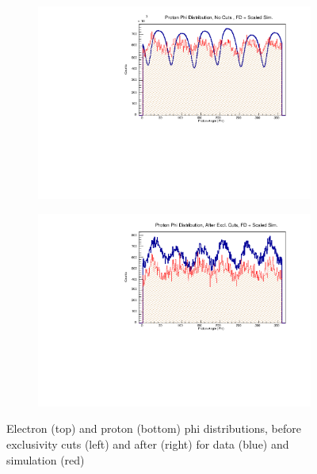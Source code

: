 \begin{figure}
\begin{subfigure}{.45\textwidth}
                \includegraphics[width=1\textwidth]{figures/Simulation/kinematics_basic/hist_proton_phi_nocut_fd_Double.pdf}
            \end{subfigure}%
            \begin{subfigure}{.45\textwidth}
                \centering
                \includegraphics[width=1\textwidth]{figures/Simulation/kinematics_basic/hist_proton_phi_excut_fd_Double.pdf}
            \end{subfigure}
            \caption[short]{Electron (top) and proton (bottom) phi distributions, before exclusivity cuts (left) and after (right) for data (blue) and simulation (red)}
        \end{figure}
        
